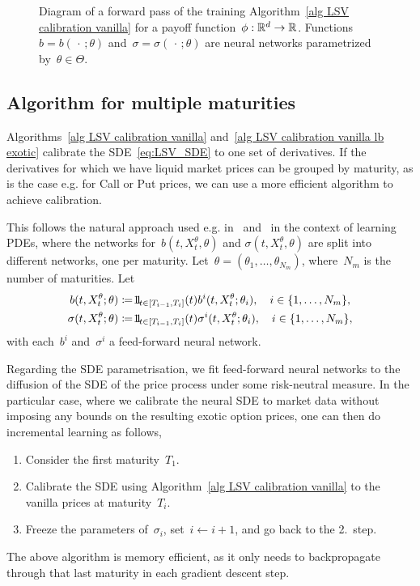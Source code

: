 \begin{figure}[H]
    \centering
    
    \caption{Diagram of a forward pass of the training Algorithm~\ref{alg LSV calibration vanilla} for a payoff function~$\phi:\mathbb{R}^d\to \mathbb{R}$. Functions~$b=b(\,\cdot\,;\theta)$ and~$\sigma=\sigma(\,\cdot\,;\theta)$ are neural networks parametrized by~$\theta\in\Theta$.}\label{fig:forwardpass}
\end{figure}

\subsection{Algorithm for multiple maturities}\label{sec many maturities}

Algorithms~\ref{alg LSV calibration vanilla} and~\ref{alg LSV calibration vanilla lb exotic}
calibrate the SDE~\eqref{eq:LSV_SDE} to one set of derivatives. 
If the derivatives for which we have liquid market prices can be grouped by  
maturity, as is the case e.g. for Call or Put prices, we
can use a more efficient algorithm to achieve calibration. 
 
This follows the natural approach used e.g. in~\cite{Cuchiero2020AModels} and~\cite{Vidales2018UnbiasedPDEs} in the context of learning PDEs, where the networks for~$b(t,X_t^{\theta},\theta)$ and 
$\sigma(t,X_t^{\theta},\theta)$ are split into different networks, one
per maturity.
Let~$\theta=(\theta_1,\ldots,\theta_{N_{m}})$, where~$N_m$ is the number of maturities. 
Let 
\begin{equation} 
\label{eq one network per maturity}
\begin{split}
b(t,X_t^{\theta};\theta) & \defEqual  \ind_{t\in[T_{i-1},T_i]}(t)b^i(t,X_t^{\theta};\theta_i), \quad i\in\{1,\ldots,N_{m}\},	\\
\sigma(t,X_t^{\theta};\theta) & \defEqual  \ind_{t\in[T_{i-1},T_i]}(t)\sigma^i(t,X_t^{\theta};\theta_i), \quad i\in\{1,\ldots,N_{m}\},	
\end{split}
\end{equation}
with each~$b^i$ and~$\sigma^i$ a feed-forward neural network. 

\begin{samepage}
Regarding the SDE parametrisation, we fit feed-forward neural networks to the diffusion of the SDE of the price process under some risk-neutral measure. In the particular case, where we calibrate the neural SDE to market data without imposing any bounds on the resulting exotic option prices, one can then do incremental learning as follows,
\begin{enumerate}
	\item Consider the first maturity~$T_1$.
	\item Calibrate the SDE using Algorithm~\ref{alg LSV calibration vanilla} to the vanilla prices at maturity~$T_i$.
	\item Freeze the parameters of~$\sigma_{i}$, set~$i \leftarrow i+1$,
	and go back to the 2.~step.  
\end{enumerate}
\nopagebreak
The above algorithm is memory efficient, as it only needs to backpropagate through that last maturity in each gradient descent step.  
\end{samepage}

